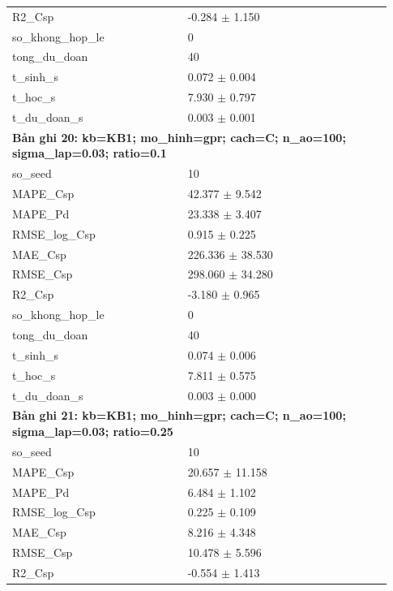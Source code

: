 \begin{longtable}{p{0.43\linewidth}p{0.50\linewidth}}
R2\_\allowbreak Csp & -0.284 $\pm$ 1.150 \\
so\_\allowbreak khong\_\allowbreak hop\_\allowbreak le & 0 \\
tong\_\allowbreak du\_\allowbreak doan & 40 \\
t\_\allowbreak sinh\_\allowbreak s & 0.072 $\pm$ 0.004 \\
t\_\allowbreak hoc\_\allowbreak s & 7.930 $\pm$ 0.797 \\
t\_\allowbreak du\_\allowbreak doan\_\allowbreak s & 0.003 $\pm$ 0.001 \\
\midrule
\multicolumn{2}{p{0.95\linewidth}}{\textbf{Bản ghi 20: kb=KB1; mo\_hinh=gpr; cach=C; n\_ao=100; sigma\_lap=0.03; ratio=0.1}} \\
so\_\allowbreak seed & 10 \\
MAPE\_\allowbreak Csp & 42.377 $\pm$ 9.542 \\
MAPE\_\allowbreak Pd & 23.338 $\pm$ 3.407 \\
RMSE\_\allowbreak log\_\allowbreak Csp & 0.915 $\pm$ 0.225 \\
MAE\_\allowbreak Csp & 226.336 $\pm$ 38.530 \\
RMSE\_\allowbreak Csp & 298.060 $\pm$ 34.280 \\
R2\_\allowbreak Csp & -3.180 $\pm$ 0.965 \\
so\_\allowbreak khong\_\allowbreak hop\_\allowbreak le & 0 \\
tong\_\allowbreak du\_\allowbreak doan & 40 \\
t\_\allowbreak sinh\_\allowbreak s & 0.074 $\pm$ 0.006 \\
t\_\allowbreak hoc\_\allowbreak s & 7.811 $\pm$ 0.575 \\
t\_\allowbreak du\_\allowbreak doan\_\allowbreak s & 0.003 $\pm$ 0.000 \\
\midrule
\multicolumn{2}{p{0.95\linewidth}}{\textbf{Bản ghi 21: kb=KB1; mo\_hinh=gpr; cach=C; n\_ao=100; sigma\_lap=0.03; ratio=0.25}} \\
so\_\allowbreak seed & 10 \\
MAPE\_\allowbreak Csp & 20.657 $\pm$ 11.158 \\
MAPE\_\allowbreak Pd & 6.484 $\pm$ 1.102 \\
RMSE\_\allowbreak log\_\allowbreak Csp & 0.225 $\pm$ 0.109 \\
MAE\_\allowbreak Csp & 8.216 $\pm$ 4.348 \\
RMSE\_\allowbreak Csp & 10.478 $\pm$ 5.596 \\
R2\_\allowbreak Csp & -0.554 $\pm$ 1.413 \\

\end{longtable}
